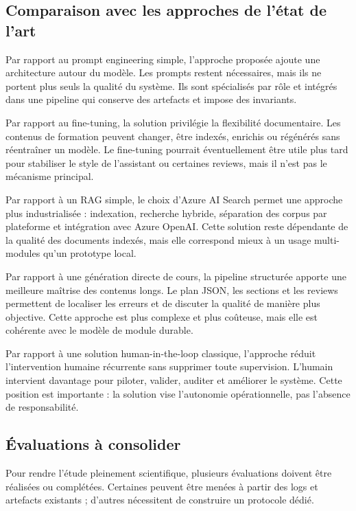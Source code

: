 \documentclass[12pt,a4paper]{article}
\begin{document}
\subsection{Comparaison avec les approches de l'état de l'art}

Par rapport au prompt engineering simple, l'approche proposée ajoute une architecture
autour du modèle. Les prompts restent nécessaires, mais ils ne portent plus seuls la
qualité du système. Ils sont spécialisés par rôle et intégrés dans une pipeline qui conserve
des artefacts et impose des invariants.

Par rapport au fine-tuning, la solution privilégie la flexibilité documentaire. Les contenus
de formation peuvent changer, être indexés, enrichis ou régénérés sans réentraîner un
modèle. Le fine-tuning pourrait éventuellement être utile plus tard pour stabiliser le style
de l'assistant ou certaines reviews, mais il n'est pas le mécanisme principal.

Par rapport à un RAG simple, le choix d'Azure AI Search permet une approche plus
industrialisée : indexation, recherche hybride, séparation des corpus par plateforme et
intégration avec Azure OpenAI. Cette solution reste dépendante de la qualité des documents
indexés, mais elle correspond mieux à un usage multi-modules qu'un prototype local.

Par rapport à une génération directe de cours, la pipeline structurée apporte une meilleure
maîtrise des contenus longs. Le plan JSON, les sections et les reviews permettent de
localiser les erreurs et de discuter la qualité de manière plus objective. Cette approche
est plus complexe et plus coûteuse, mais elle est cohérente avec le modèle de module
durable.

Par rapport à une solution human-in-the-loop classique, l'approche réduit l'intervention
humaine récurrente sans supprimer toute supervision. L'humain intervient davantage pour
piloter, valider, auditer et améliorer le système. Cette position est importante : la solution
vise l'autonomie opérationnelle, pas l'absence de responsabilité.

\subsection{Évaluations à consolider}

Pour rendre l'étude pleinement scientifique, plusieurs évaluations doivent être réalisées
ou complétées. Certaines peuvent être menées à partir des logs et artefacts existants ;
d'autres nécessitent de construire un protocole dédié.
\end{document}
